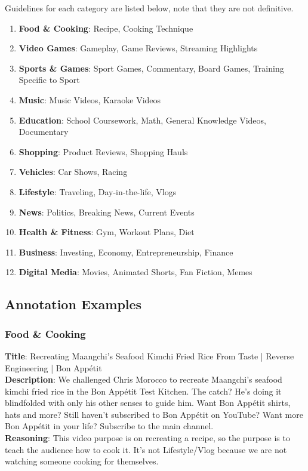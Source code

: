 \documentclass[11pt]{article}
\begin{document}
\noindent Guidelines for each category are listed below, note that they are not definitive.
\begin{enumerate}
  \item \textbf{Food \& Cooking}: Recipe, Cooking Technique
  \item \textbf{Video Games}: Gameplay, Game Reviews, Streaming Highlights
  \item \textbf{Sports \& Games}: Sport Games, Commentary, Board Games, Training Specific to Sport
  \item \textbf{Music}: Music Videos, Karaoke Videos
  \item \textbf{Education}: School Coursework, Math, General Knowledge Videos, Documentary
  \item \textbf{Shopping}: Product Reviews, Shopping Hauls
  \item \textbf{Vehicles}: Car Shows, Racing
  \item \textbf{Lifestyle}: Traveling, Day-in-the-life, Vlogs
  \item \textbf{News}: Politics, Breaking News, Current Events
  \item \textbf{Health \& Fitness}: Gym, Workout Plans, Diet
  \item \textbf{Business}: Investing, Economy, Entrepreneurship, Finance
  \item \textbf{Digital Media}: Movies, Animated Shorts, Fan Fiction, Memes
\end{enumerate}

\subsection{Annotation Examples}

\subsubsection{Food \& Cooking}
\textbf{Title}: Recreating Maangchi's Seafood Kimchi Fried Rice From Taste | Reverse Engineering | Bon Appétit \\
\textbf{Description}: We challenged Chris Morocco to recreate Maangchi's seafood kimchi fried rice in the Bon Appétit Test Kitchen. The catch? He’s doing it blindfolded with only his other senses to guide him.
    Want Bon Appétit shirts, hats and more?
    Still haven’t subscribed to Bon Appétit on YouTube?
    Want more Bon Appétit in your life? Subscribe to the main channel. \\
\textbf{Reasoning}: This video purpose is on recreating a recipe, so the purpose is to teach the audience how to cook it. It's not Lifestyle/Vlog because we are not watching someone cooking for themselves. 
\end{document}
